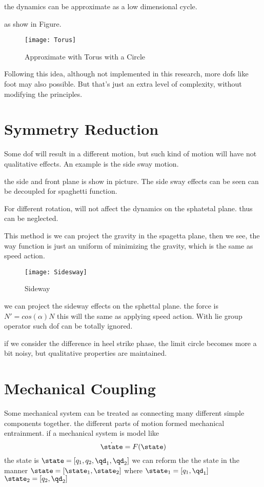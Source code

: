 the dynamics can be approximate as a low dimensional cycle.

as show in Figure.

\begin{figure}[!htbp]
  \begin{center}
      \texttt{[image: Torus]}
    \caption{Approximate with Torus with a Circle}
    \label{fig:approximate}
\end{center}
\end{figure}


Following this idea, although not implemented in this research, more dofs like foot may also possible.
But that's just an extra level of complexity, without modifying the principles. 
\section{Symmetry Reduction}
Some dof will result in a different motion, but such kind of motion will have not qualitative effects.
An example is the side sway motion.

the side and front plane is show in picture.
The side sway effects can be seen can be decoupled for spaghetti function.


For different rotation, will not affect the dynamics on the sphatetal plane.
thus can be neglected.

This method is we can project the gravity in the spagetta plane,
then we see, the way function is just an uniform of minimizing the gravity,
which is the same as speed action.

\begin{figure}[!htbp]
  \begin{center}
      \texttt{[image: Sidesway]}
    \caption{Sideway}
    \label{fig:sidesway}
\end{center}
\end{figure}


we can project the sideway effects on the sphettal plane. the force is $N'=cos(\alpha)N$
this will the same as applying speed action.
With lie group operator such dof can be totally ignored.


if we consider the difference in heel strike phase,
the limit circle becomes more a bit noisy, but qualitative properties are maintained.

\section{Mechanical Coupling}
Some mechanical system can be treated as connecting many different simple components together.
the different parts of motion formed mechanical entrainment.
if a mechanical system is model like
\[
\dot{\state}=F(\state)
\]
the state is $\state=[q_1,q_2,\qd_1,\qd_2]$
we can reform the the state in the manner
$\state=[\state_1,\state_2]$
where
$\state_1=[q_1,\qd_1]$
$\state_2=[q_2,\qd_2]$

